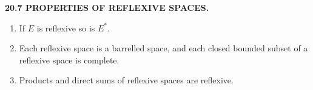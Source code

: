 \textbf{20.7 PROPERTIES OF REFLEXIVE SPACES.}

\begin{enumerate}
\item[(i)] If $E$ is reflexive so is $E^*$.
\item[(ii)] Each reflexive space is a barrelled space, and each closed bounded subset of a reflexive space is complete.
\item[(iii)] Products and direct sums of reflexive spaces are reflexive.
\end{enumerate}
